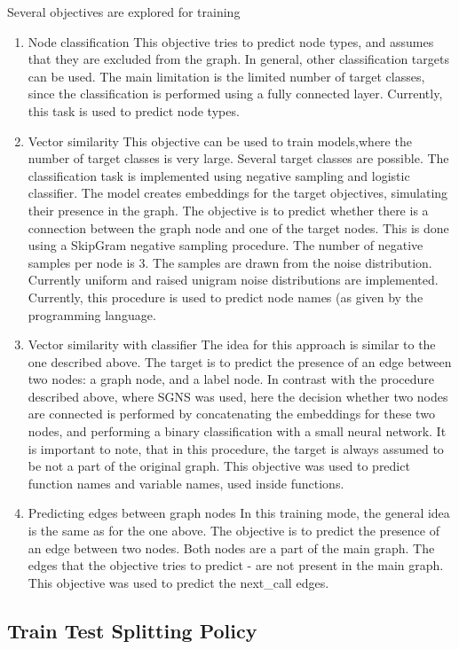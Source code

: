 \documentclass[a4paper,twoside]{article}
\begin{document}
Several objectives are explored for training 
\begin{enumerate}
    \item Node classification
    This objective tries to predict node types, and assumes that they are excluded from the graph. In general, other classification targets can be used. The main limitation is the limited number of target classes, since the classification is performed using a fully connected layer. Currently, this task is used to predict node types. 
    \item Vector similarity
    This objective can be used to train models,where the number of target classes is very large. Several target classes are possible. The classification task is implemented using negative sampling and logistic classifier. The model creates embeddings for the target objectives, simulating their presence in the graph. The objective is to predict whether there is a connection between the graph node and one of the target nodes. This is done using a SkipGram negative sampling procedure. The number of negative samples per node is 3. The samples are drawn from the noise distribution. Currently uniform and raised unigram noise distributions are implemented. Currently, this procedure is used to predict node names (as given by the programming language. 
    \item Vector similarity with classifier
    The idea for this approach is similar to the one described above. The target is to predict the presence of an edge between two nodes: a graph node, and a label node. In contrast with the procedure described above, where SGNS was used, here the decision whether two nodes are connected is performed by concatenating the embeddings for these two nodes, and performing a binary classification with a small neural network. It is important to note, that in this procedure, the target is always assumed to be not a part of the original graph. This objective was used to predict function names and variable names, used inside functions.
    \item Predicting edges between graph nodes
    In this training mode, the general idea is the same as for the one above. The objective is to predict the presence of an edge between two nodes. Both nodes are a part of the main graph. The edges that the objective tries to predict - are not present in the main graph. This objective was used to predict the next\_call edges.
\end{enumerate}

\subsection{Train Test Splitting Policy}
\end{document}

